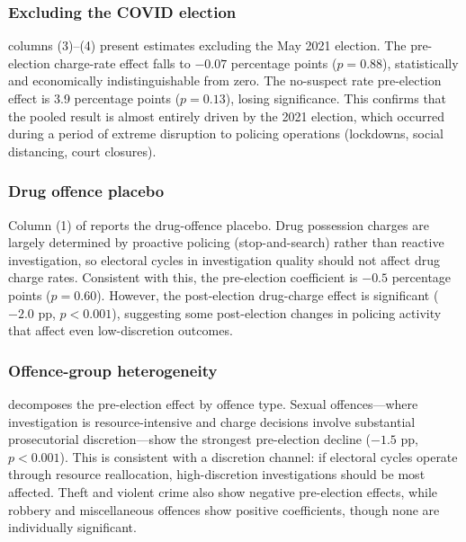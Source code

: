 \documentclass[12pt]{article}
\begin{document}


\subsubsection*{Excluding the COVID election}  columns (3)--(4) present estimates excluding the May 2021 election. The pre-election charge-rate effect falls to $-0.07$ percentage points ($p = 0.88$), statistically and economically indistinguishable from zero. The no-suspect rate pre-election effect is 3.9 percentage points ($p = 0.13$), losing significance. This confirms that the pooled result is almost entirely driven by the 2021 election, which occurred during a period of extreme disruption to policing operations (lockdowns, social distancing, court closures).

\subsubsection*{Drug offence placebo} Column (1) of  reports the drug-offence placebo. Drug possession charges are largely determined by proactive policing (stop-and-search) rather than reactive investigation, so electoral cycles in investigation quality should not affect drug charge rates. Consistent with this, the pre-election coefficient is $-0.5$ percentage points ($p = 0.60$). However, the post-election drug-charge effect is significant ($-2.0$ pp, $p < 0.001$), suggesting some post-election changes in policing activity that affect even low-discretion outcomes.



\subsubsection*{Offence-group heterogeneity}  decomposes the pre-election effect by offence type. Sexual offences---where investigation is resource-intensive and charge decisions involve substantial prosecutorial discretion---show the strongest pre-election decline ($-1.5$ pp, $p < 0.001$). This is consistent with a discretion channel: if electoral cycles operate through resource reallocation, high-discretion investigations should be most affected. Theft and violent crime also show negative pre-election effects, while robbery and miscellaneous offences show positive coefficients, though none are individually significant.


\end{document}
